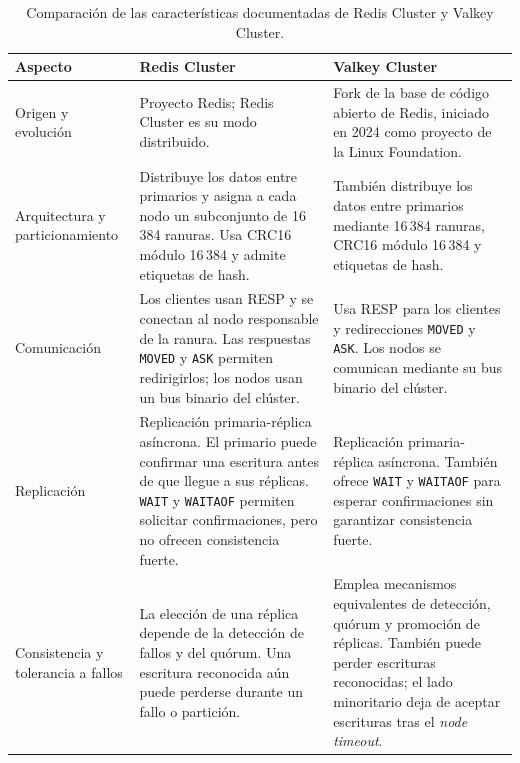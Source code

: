 \documentclass[12pt,a4paper]{article}
\begin{document}
\begin{table}[htbp]
    \centering
    \small
    \renewcommand{\arraystretch}{1.0}
    \caption{Comparación de las características documentadas de Redis Cluster y Valkey Cluster.}
    \label{tab:redis-valkey}
    \begin{tabularx}{\textwidth}{|>{\raggedright\arraybackslash}p{2.5cm}|>{\raggedright\arraybackslash}X|>{\raggedright\arraybackslash}X|}
        \hline
        \textbf{Aspecto} & \textbf{Redis Cluster} & \textbf{Valkey Cluster} \\
        \hline
        Origen y evolución & Proyecto Redis; Redis Cluster es su modo distribuido. & Fork de la base de código abierto de Redis, iniciado en 2024 como proyecto de la Linux Foundation. \cite{valkeyHistory} \\
        \hline
        Arquitectura y particionamiento & Distribuye los datos entre primarios y asigna a cada nodo un subconjunto de 16\,384 ranuras. Usa CRC16 módulo 16\,384 y admite etiquetas de hash. \cite{redisClusterSpec} & También distribuye los datos entre primarios mediante 16\,384 ranuras, CRC16 módulo 16\,384 y etiquetas de hash. \cite{valkeyClusterSpec} \\
        \hline
        Comunicación & Los clientes usan RESP y se conectan al nodo responsable de la ranura. Las respuestas \texttt{MOVED} y \texttt{ASK} permiten redirigirlos; los nodos usan un bus binario del clúster. \cite{redisResp,redisClusterSpec} & Usa RESP para los clientes y redirecciones \texttt{MOVED} y \texttt{ASK}. Los nodos se comunican mediante su bus binario del clúster. \cite{valkeyProtocol,valkeyClusterSpec} \\
        \hline
        Replicación & Replicación primaria-réplica asíncrona. El primario puede confirmar una escritura antes de que llegue a sus réplicas. \texttt{WAIT} y \texttt{WAITAOF} permiten solicitar confirmaciones, pero no ofrecen consistencia fuerte. \cite{redisReplication,redisClusterSpec,redisClusterScaling,redisWAITAOF} & Replicación primaria-réplica asíncrona. También ofrece \texttt{WAIT} y \texttt{WAITAOF} para esperar confirmaciones sin garantizar consistencia fuerte. \cite{valkeyReplication,valkeyClusterTutorial,valkeyWAITAOF} \\
        \hline
        Consistencia y tolerancia a fallos & La elección de una réplica depende de la detección de fallos y del quórum. Una escritura reconocida aún puede perderse durante un fallo o partición. \cite{redisClusterSpec,redisClusterScaling} & Emplea mecanismos equivalentes de detección, quórum y promoción de réplicas. También puede perder escrituras reconocidas; el lado minoritario deja de aceptar escrituras tras el \textit{node timeout}. \cite{valkeyClusterSpec,valkeyClusterTutorial} \\
        \hline
    \end{tabularx}
\end{table}
\end{document}
